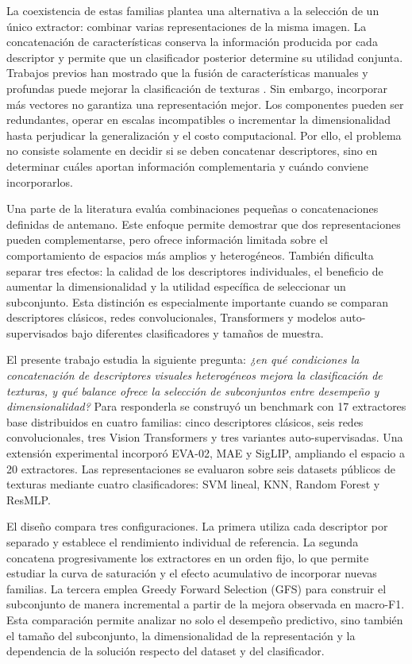 \documentclass[a4paper,fleqn]{cas-sc}
\begin{document}
La coexistencia de estas familias plantea una alternativa a la selección de un único extractor: combinar varias representaciones de la misma imagen. La concatenación de características conserva la información producida por cada descriptor y permite que un clasificador posterior determine su utilidad conjunta. Trabajos previos han mostrado que la fusión de características manuales y profundas puede mejorar la clasificación de texturas \citep{sanchez2013image,cimpoi2016fisher,zhang2017deepten}. Sin embargo, incorporar más vectores no garantiza una representación mejor. Los componentes pueden ser redundantes, operar en escalas incompatibles o incrementar la dimensionalidad hasta perjudicar la generalización y el costo computacional. Por ello, el problema no consiste solamente en decidir si se deben concatenar descriptores, sino en determinar cuáles aportan información complementaria y cuándo conviene incorporarlos.

Una parte de la literatura evalúa combinaciones pequeñas o concatenaciones definidas de antemano. Este enfoque permite demostrar que dos representaciones pueden complementarse, pero ofrece información limitada sobre el comportamiento de espacios más amplios y heterogéneos. También dificulta separar tres efectos: la calidad de los descriptores individuales, el beneficio de aumentar la dimensionalidad y la utilidad específica de seleccionar un subconjunto. Esta distinción es especialmente importante cuando se comparan descriptores clásicos, redes convolucionales, Transformers y modelos auto-supervisados bajo diferentes clasificadores y tamaños de muestra.

El presente trabajo estudia la siguiente pregunta: \emph{¿en qué condiciones la concatenación de descriptores visuales heterogéneos mejora la clasificación de texturas, y qué balance ofrece la selección de subconjuntos entre desempeño y dimensionalidad?} Para responderla se construyó un benchmark con 17 extractores base distribuidos en cuatro familias: cinco descriptores clásicos, seis redes convolucionales, tres Vision Transformers y tres variantes auto-supervisadas. Una extensión experimental incorporó EVA-02, MAE y SigLIP, ampliando el espacio a 20 extractores. Las representaciones se evaluaron sobre seis datasets públicos de texturas mediante cuatro clasificadores: SVM lineal, KNN, Random Forest y ResMLP.

El diseño compara tres configuraciones. La primera utiliza cada descriptor por separado y establece el rendimiento individual de referencia. La segunda concatena progresivamente los extractores en un orden fijo, lo que permite estudiar la curva de saturación y el efecto acumulativo de incorporar nuevas familias. La tercera emplea Greedy Forward Selection (GFS) para construir el subconjunto de manera incremental a partir de la mejora observada en macro-F1. Esta comparación permite analizar no solo el desempeño predictivo, sino también el tamaño del subconjunto, la dimensionalidad de la representación y la dependencia de la solución respecto del dataset y del clasificador.
\end{document}
